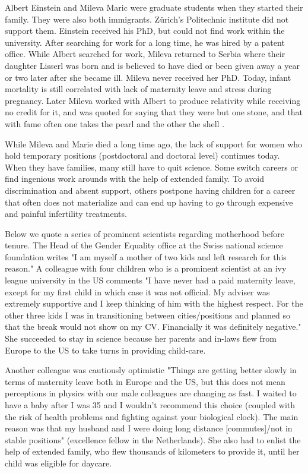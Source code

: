 \documentclass[utf8]{frontiersSCNS} %
\begin{document}
Albert Einstein and Mileva Maric were graduate students when they started their family. They were also both immigrants. Z\"{u}rich's Politechnic institute did not support them. Einstein received his PhD, but could not find work within the university. After searching for work for a long time, he was hired by a patent office. While Albert searched for work, Mileva returned to Serbia where their daughter Lisserl was born and is believed to have died or been given away a year or two later after she became ill. Mileva never received her PhD. Today, infant mortality is still correlated with lack of maternity leave and stress during pregnancy. Later Mileva worked with Albert to produce relativity while receiving no credit for it, and was quoted for saying that they were but one stone, and that with fame often one takes the pearl and the other the shell \citep{Mileva}. 

While Mileva and Marie died a long time ago, the lack of support for women who hold temporary positions  (postdoctoral and doctoral level) continues today. When they have families, many still have to quit science. Some switch careers or find ingenious work arounds with the help of extended family. To avoid discrimination and absent support, others postpone having children for a career that often does not materialize and can end up having to go through expensive and painful infertility treatments. 

Below we quote a series of prominent scientists regarding motherhood before tenure. The Head of the Gender Equality office at the Swiss national science foundation writes "I am myself a mother of two kids and left research for this reason."  A colleague with four children who is a prominent scientist at an ivy league university in the US comments "I have never had a paid maternity leave, except for my first child in which case it was not official. My adviser was extremely supportive and I keep thinking of him with the highest respect. For the other three kids I was in transitioning between cities/positions and planned so that the break would not show on my CV. Financially it was definitely negative." She succeeded to stay in science because her parents and in-laws flew from Europe to the US to take turns in providing child-care. 

Another colleague was cautiously optimistic "Things are getting better slowly in terms of maternity leave both in Europe and the US, but this does not mean perceptions in physics with our male colleagues are changing as fast. I waited to have a baby after I was 35 and I wouldn't recommend this choice (coupled with the risk of health problems and fighting against your biological clock). The main reason was that my husband and I were doing long distance [commutes]/not in stable positions" (excellence fellow in the Netherlands). She also had to enlist the help of extended family, who flew thousands of kilometers to provide it, until her child was eligible for daycare. 
\end{document}
